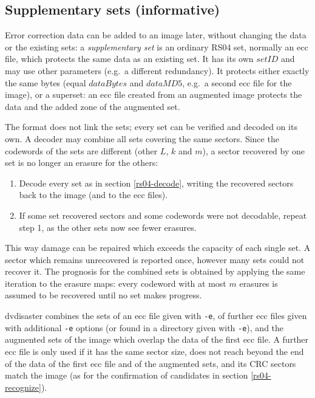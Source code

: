 \subsection{Supplementary sets (informative)}
\label{rs04-supplementary}

Error correction data can be added to an image later, without changing the
data or the existing sets: a {\em supplementary set} is an ordinary RS04
set, normally an ecc file, which protects the same data as an existing set.
It has its own $setID$ and may use other parameters (e.g.\ a different
redundancy). It protects either exactly the same bytes (equal $dataBytes$
and $dataMD5$, e.g.\ a second ecc file for the image), or a superset: an
ecc file created from an augmented image protects the data and the added
zone of the augmented set.

\medskip

The format does not link the sets; every set can be verified and decoded
on its own. A decoder may combine all sets covering the same sectors.
Since the codewords of the sets are different (other $L$, $k$ and $m$), a
sector recovered by one set is no longer an erasure for the others:

\begin{enumerate}
\item Decode every set as in section \ref{rs04-decode}, writing the
  recovered sectors back to the image (and to the ecc files).
\item If some set recovered sectors and some codewords were not decodable,
  repeat step 1, as the other sets now see fewer erasures.
\end{enumerate}

This way damage can be repaired which exceeds the capacity of each single
set. A sector which remains unrecovered is reported once, however many
sets could not recover it. The prognosis for the combined sets is obtained by applying the same
iteration to the erasure maps: every codeword with at most $m$ erasures is
assumed to be recovered until no set makes progress.

\medskip

dvdisaster combines the sets of an ecc file given with {\tt -e}, of further
ecc files given with additional {\tt -e} options (or found in a directory
given with {\tt -e}), and the augmented sets of the image which overlap the
data of the first ecc file. A further ecc file is only used if it has the
same sector size, does not reach beyond the end of the data of the first ecc
file and of the augmented sets, and its CRC sectors match the image (as for
the confirmation of candidates in section \ref{rs04-recognize}).

